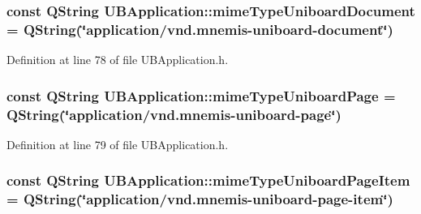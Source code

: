 \hypertarget{class_u_b_application_a7f637d41fcccf67064e478b4f5ecc67e}{
\subsubsection[{mime\-Type\-Uniboard\-Document}]{\setlength{\rightskip}{0pt plus 5cm}const Q\-String U\-B\-Application\-::mime\-Type\-Uniboard\-Document = Q\-String(\char`\"{}application/vnd.\-mnemis-\/uniboard-\/document\char`\"{})\hspace{0.3cm}{\ttfamily [static]}}}\label{d8/d81/class_u_b_application_a7f637d41fcccf67064e478b4f5ecc67e}


Definition at line 78 of file U\-B\-Application.\-h.

\hypertarget{class_u_b_application_ad4f533c7971ce1c441b13a1b61e17525}{
\subsubsection[{mime\-Type\-Uniboard\-Page}]{\setlength{\rightskip}{0pt plus 5cm}const Q\-String U\-B\-Application\-::mime\-Type\-Uniboard\-Page = Q\-String(\char`\"{}application/vnd.\-mnemis-\/uniboard-\/page\char`\"{})\hspace{0.3cm}{\ttfamily [static]}}}\label{d8/d81/class_u_b_application_ad4f533c7971ce1c441b13a1b61e17525}


Definition at line 79 of file U\-B\-Application.\-h.

\hypertarget{class_u_b_application_a14d60a2d3e62d98177cada4c13149926}{
\subsubsection[{mime\-Type\-Uniboard\-Page\-Item}]{\setlength{\rightskip}{0pt plus 5cm}const Q\-String U\-B\-Application\-::mime\-Type\-Uniboard\-Page\-Item = Q\-String(\char`\"{}application/vnd.\-mnemis-\/uniboard-\/page-\/item\char`\"{})\hspace{0.3cm}{\ttfamily [static]}}}\label{d8/d81/class_u_b_application_a14d60a2d3e62d98177cada4c13149926}


